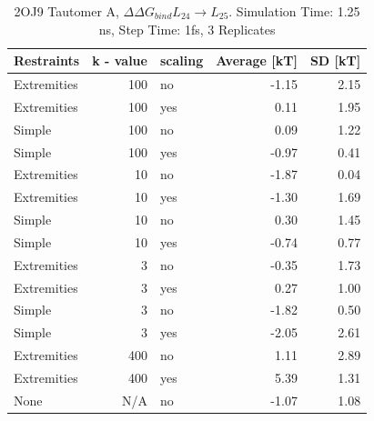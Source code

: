 \documentclass[oneside]{scrreprt}
\begin{document}
\begin{table}\small
\begin{center}
    \begin{tabular}{l|r|l|r|r}
        Restraints & k - value & scaling & Average [kT] & SD [kT]   \\
        \hline
        Extremities & 100 & no  & -1.15 & 2.15                                   \\
        Extremities & 100 & yes & 0.11  & 1.95                                   \\
        Simple      & 100 & no  & 0.09  & 1.22                                   \\
        Simple      & 100 & yes & -0.97 & 0.41  \\
        Extremities & 10  & no  & -1.87 & 0.04   \\
        Extremities & 10  & yes & -1.30 & 1.69                                   \\
        Simple      & 10  & no  & 0.30  & 1.45                                   \\
        Simple      & 10  & yes & -0.74 & 0.77   \\
        Extremities & 3   & no  & -0.35 & 1.73                                   \\
        Extremities & 3   & yes & 0.27  & 1.00                                   \\
        Simple      & 3   & no  & -1.82 & 0.50   \\
        Simple      & 3   & yes & -2.05 & 2.61                                   \\
        Extremities & 400 & no  & 1.11  & 2.89                                   \\
        Extremities & 400 & yes & 5.39  & 1.31                                   \\
        None        & N/A & no  & -1.07 & 1.08                                  
    \end{tabular}
\end{center}
\caption{2OJ9 Tautomer A, $\Delta\Delta G_{bind}L_{24}\xrightarrow{} L_{25}$. Simulation Time: 1.25 ns, Step Time: 1fs, 3 Replicates}
\label{tab:2oj9_taapdb_24to25_shortruns}
\end{table}
\end{document}
